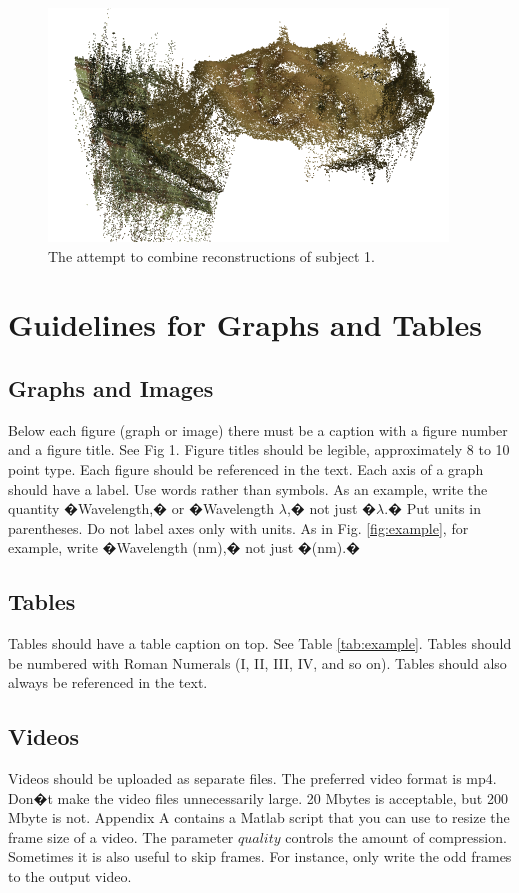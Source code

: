 \documentclass[journal]{IEEEtran}
\begin{document}
\begin{figure}
\centering
\includegraphics[width=\linewidth]{combined-faces}
\caption{The attempt to combine reconstructions of subject 1.}
\label{fig:combined-faces}
\end{figure}

\FloatBarrier

\section{Guidelines for Graphs and Tables}
\subsection{Graphs and Images}
Below each figure (graph or image) there must be a caption with a figure number and a figure title. See Fig 1. Figure titles should be legible, approximately 8 to 10 point type. Each figure should be referenced in the text. Each axis of a graph should have a label. Use words rather than symbols. As an example, write the quantity �Wavelength,� or �Wavelength $\lambda$,� not just �$\lambda$.� Put units in parentheses. Do not label axes only with units. As in Fig. \ref{fig:example}, for example, write �Wavelength (nm),� not just �(nm).� 

\subsection{Tables} 
Tables should have a table caption on top. See Table \ref{tab:example}. Tables should be numbered with Roman Numerals (I, II, III, IV, and so on). Tables should also always be referenced in the text.

\subsection{Videos}
Videos should be uploaded as separate files. The preferred video format is mp4. Don�t make the video files unnecessarily large. 20 Mbytes is acceptable, but 200 Mbyte is not. Appendix A contains a Matlab script that you can use to resize the frame size of a video. The parameter $quality$ controls the amount of compression. Sometimes it is also useful to skip frames. For instance, only write the odd frames to the output video. 
\end{document}
